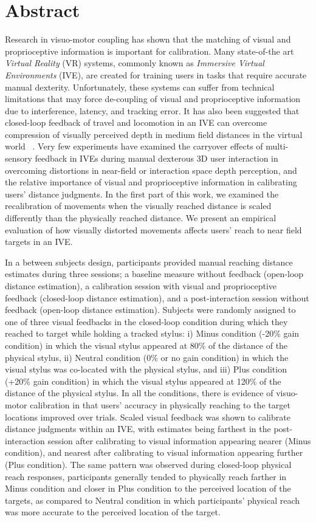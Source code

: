 \chapter*{Abstract}
Research in visuo-motor coupling has shown that the matching of visual and proprioceptive information is important for calibration. Many state-of-the art \textit{Virtual Reality} (VR) systems, commonly known as \textit{Immersive Virtual Environments} (IVE), are created for training users in tasks that require accurate manual dexterity. Unfortunately, these systems can suffer from technical limitations that may force de-coupling of visual and proprioceptive information due to interference, latency, and tracking error. It has also been suggested that closed-loop feedback of travel and locomotion in an IVE can overcome compression of visually perceived depth in medium field distances in the virtual world ~\cite{KCT13,MCT06}. Very few experiments have examined the carryover effects of multi-sensory feedback in IVEs during manual dexterous 3D user interaction in overcoming distortions in near-field or interaction space depth perception, and the relative importance of visual and proprioceptive information in calibrating users’ distance judgments. In the first part of this work, we examined the recalibration of movements when the visually reached distance is scaled differently than the physically reached distance. We present an empirical evaluation of how visually distorted movements affects users' reach to near field targets %
in an IVE. 

In a between subjects design, participants provided manual reaching distance estimates during three sessions; a baseline measure without feedback (open-loop distance estimation), a calibration session with visual and proprioceptive feedback (closed-loop distance estimation), and a post-interaction session without feedback (open-loop distance estimation). Subjects were randomly assigned to one of three visual feedbacks in the closed-loop condition during which they reached to target while holding a tracked stylus: i) Minus condition (-20\% gain condition) in which the visual stylus appeared at 80\% of the distance of the physical stylus, ii) Neutral condition (0\% or no gain condition) in which the visual stylus was co-located with the physical stylus, and iii) Plus condition (+20\% gain condition) in which the visual stylus appeared at 120\% of the distance of the physical stylus. In all the conditions, there is evidence of visuo-motor calibration in that users' accuracy in physically reaching to the target locations improved over trials. Scaled visual feedback was shown to calibrate distance judgments within an IVE, with estimates being farthest in the post-interaction session after calibrating to visual information appearing nearer (Minus condition), and nearest after calibrating to visual information appearing further (Plus condition). The same pattern was observed during closed-loop physical reach responses, participants generally tended to physically reach farther in Minus condition and closer in Plus condition to the perceived location of the targets, as compared to Neutral condition in which participants' physical reach was more accurate to the perceived location of the target.
 
